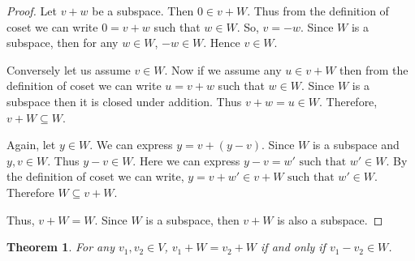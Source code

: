\documentclass[12pt, a4paper]{article}
\newtheorem{theorem}{Theorem}[section]
\theoremstyle{definition}
\theoremstyle{remark}
\newcommand{\st}{\text{ such that }}
\begin{document}
	\begin{proof}
		Let $v+w$ be a subspace. Then $0 \in v+W$. Thus from the definition of coset we can write $0 = v+w$ such that $w \in W$. So, $v=-w$. Since $W$ is a subspace, then for any $w \in W$, $-w \in W$. Hence $v \in W$.
		
		Conversely let us assume $v \in W$. Now if we assume any $u \in v+W$ then from the definition of coset we can write $u = v+w$ such that $w \in W$. Since $W$ is a subspace then it is closed under addition. Thus $v+w=u \in W$. Therefore, $v+W \subseteq W$.
		
		Again, let $y \in W$. We can express $y = v + (y - v)$. Since $W$ is a subspace and $y, v \in W$. Thus $y - v \in W$. Here we can express $y-v = w' \st w' \in W$. By the definition of coset we can write, $y = v+w' \in v+W \st w' \in W$. Therefore $W \subseteq v+W$.
		
		Thus, $v+W = W$. Since $W$ is a subspace, then $v+W$ is also a subspace.
	\end{proof}
	
	\begin{theorem}
		For any $v_1, v_2 \in V$, $v_1 + W = v_2 + W$ if and only if $v_1 - v_2 \in W$.
	\end{theorem}
	
\end{document}

